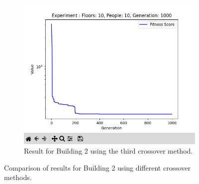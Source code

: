 \begin{figure}[h]
\begin{subfigure}[b]{0.45\linewidth}
		\label{fig:results/B2_Co2}
	\end{subfigure}
	\hfill
	\begin{subfigure}[b]{0.45\linewidth}
		\centering
		\includegraphics[width=\linewidth]{results/B2_Co3.png}
		\caption{Result for Building 2 using the third crossover method.}
		\label{fig:results/B2_Co3}
	\end{subfigure}
	\caption{Comparison of results for Building 2 using different crossover methods.}
	\label{fig:results/B2_comparison}
\end{figure}
